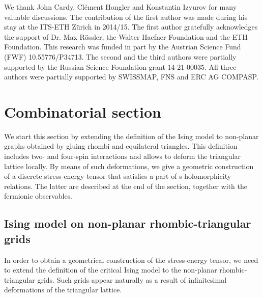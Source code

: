 \documentclass[reqno,11pt,a4paper]{amsart}
\theoremstyle{remark}
\begin{document}
\medskip

We thank John Cardy, Cl\'ement Hongler and Konstantin Izyurov for many valuable discussions.
The contribution of the first author was made during his stay at the ITS-ETH Zürich in 2014/15. The first author gratefully acknowledges the support of Dr. Max Rössler, the Walter Haefner Foundation and the ETH Foundation.
This research was funded in part by the Austrian Science Fund (FWF) 10.55776/P34713.
The second and the third authors were partially supported by the Russian Science Foundation grant 14-21-00035.
All three authors were partially supported by SWISSMAP, FNS and ERC AG COMPASP.


\setcounter{equation}{0}

\section{Combinatorial section}
\label{sec:combi}

We start this section by extending the definition of the Ising model to non-planar graphs obtained by gluing rhombi and equilateral triangles. This definition includes two- and four-spin interactions and allows to deform the triangular lattice locally. By means of such deformations, we give a geometric construction of a discrete stress-energy tensor that satisfies a part of s-holomorphicity relations.
The latter are described at the end of the section, together with the fermionic observables.


\subsection{Ising model on non-planar rhombic-triangular grids}
\label{sub:ising-on-rhombic-tiling}

In order to obtain a geometrical construction of the stress-energy tensor, we need to extend the definition of the critical Ising model to the non-planar rhombic-triangular grids. Such grids appear naturally as a result of infinitesimal deformations of the triangular lattice.
\end{document}
